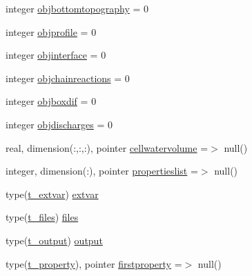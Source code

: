 \begin{DoxyCompactItemize}
\item 
integer \mbox{\hyperlink{structmoduleporousmediaproperties_1_1t__porousmediaproperties_ab8205b86bff24ca424fb2c5d6c5e4b30}{objbottomtopography}} = 0
\item 
integer \mbox{\hyperlink{structmoduleporousmediaproperties_1_1t__porousmediaproperties_a5b01ab8633489d4504b9e20f24b088b7}{objprofile}} = 0
\item 
integer \mbox{\hyperlink{structmoduleporousmediaproperties_1_1t__porousmediaproperties_acda4ccff1794ade0d71e3f898e51cc94}{objinterface}} = 0
\item 
integer \mbox{\hyperlink{structmoduleporousmediaproperties_1_1t__porousmediaproperties_a2e2c45baa2a7182dec168a704bdf9e68}{objchainreactions}} = 0
\item 
integer \mbox{\hyperlink{structmoduleporousmediaproperties_1_1t__porousmediaproperties_a9e2cc2927a2a7dfa317d07f63060c274}{objboxdif}} = 0
\item 
integer \mbox{\hyperlink{structmoduleporousmediaproperties_1_1t__porousmediaproperties_a842737e663bec89cf5a3fb7385f9fa77}{objdischarges}} = 0
\item 
real, dimension(\+:,\+:,\+:), pointer \mbox{\hyperlink{structmoduleporousmediaproperties_1_1t__porousmediaproperties_a0de3dc773796052f25381335b2330239}{cellwatervolume}} =$>$ null()
\item 
integer, dimension(\+:), pointer \mbox{\hyperlink{structmoduleporousmediaproperties_1_1t__porousmediaproperties_acaa81021d1cc6e802d4b3b08b1ddfcb9}{propertieslist}} =$>$ null()
\item 
type(\mbox{\hyperlink{structmoduleporousmediaproperties_1_1t__extvar}{t\+\_\+extvar}}) \mbox{\hyperlink{structmoduleporousmediaproperties_1_1t__porousmediaproperties_a53f725634ff78934b993c6557c082968}{extvar}}
\item 
type(\mbox{\hyperlink{structmoduleporousmediaproperties_1_1t__files}{t\+\_\+files}}) \mbox{\hyperlink{structmoduleporousmediaproperties_1_1t__porousmediaproperties_a477c4a053699cd6e35d6b072a1867171}{files}}
\item 
type(\mbox{\hyperlink{structmoduleporousmediaproperties_1_1t__output}{t\+\_\+output}}) \mbox{\hyperlink{structmoduleporousmediaproperties_1_1t__porousmediaproperties_ad4df38974117dccfc9915ce2f47d2480}{output}}
\item 
type(\mbox{\hyperlink{structmoduleporousmediaproperties_1_1t__property}{t\+\_\+property}}), pointer \mbox{\hyperlink{structmoduleporousmediaproperties_1_1t__porousmediaproperties_a83b397ecc7e12aecc7a21035c958d308}{firstproperty}} =$>$ null()

\end{DoxyCompactItemize}
